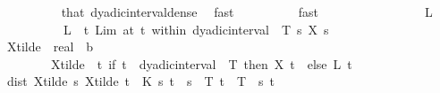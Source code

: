 \begin{isabellebody}
\ \ \ \ \ \ \ \ \isamarkupfalse%
\ that\ dyadic{\isacharunderscore}{\kern0pt}interval{\isacharunderscore}{\kern0pt}dense\ \isamarkupfalse%
\ fast\isanewline
\ \ \ \ \ \ \ \ \isamarkupfalse%
\ fast\isanewline
\ \ \ \ \ \ \ \ \isamarkupfalse%
\isanewline
\ \ \ \ \ \ \isamarkupfalse%
\ L\ \isanewline
\ \ \ \ \ \ \ \ \ \ {\isachardoublequoteopen}L\ {\isasymequiv}\ {\isacharparenleft}{\kern0pt}{\isasymlambda}t{\isachardot}{\kern0pt}\ {\isacharparenleft}{\kern0pt}Lim\ {\isacharparenleft}{\kern0pt}at\ t\ within\ dyadic{\isacharunderscore}{\kern0pt}interval\ {}\ T{\isacharparenright}{\kern0pt}\ {\isacharparenleft}{\kern0pt}{\isasymlambda}s{\isachardot}{\kern0pt}\ X\ s\ {\isasymomega}{\isacharparenright}{\kern0pt}{\isacharparenright}{\kern0pt}{\isacharparenright}{\kern0pt}{\isachardoublequoteclose}\isanewline
\ \ \ \ \ \ \isamarkupfalse%
\ X{\isacharunderscore}{\kern0pt}tilde\ {\isacharcolon}{\kern0pt}{\isacharcolon}{\kern0pt}\ {\isachardoublequoteopen}real\ {\isasymRightarrow}\ {\isacharprime}{\kern0pt}b{\isachardoublequoteclose}\ \isanewline
\ \ \ \ \ \ \ \ {\isachardoublequoteopen}X{\isacharunderscore}{\kern0pt}tilde\ {\isasymequiv}\ {\isasymlambda}t{\isachardot}{\kern0pt}\ if\ t\ {\isasymin}\ dyadic{\isacharunderscore}{\kern0pt}interval\ {}\ T\ then\ X\ t\ {\isasymomega}\ else\ L\ t{\isachardoublequoteclose}\isanewline
\ \ \ \ \ \ \isamarkupfalse%
\ \isamarkupfalse%
\ {\isachardoublequoteopen}dist\ {\isacharparenleft}{\kern0pt}X{\isacharunderscore}{\kern0pt}tilde\ s{\isacharparenright}{\kern0pt}\ {\isacharparenleft}{\kern0pt}X{\isacharunderscore}{\kern0pt}tilde\ t{\isacharparenright}{\kern0pt}\ {\isasymle}\ {\isacharquery}{\kern0pt}K\ s\ t{\isachardoublequoteclose}\ \ {\isachardoublequoteopen}s\ {\isasymin}\ {\isacharbraceleft}{\kern0pt}{}{\isachardot}{\kern0pt}{\isachardot}{\kern0pt}T{\isacharbraceright}{\kern0pt}{\isachardoublequoteclose}\ {\isachardoublequoteopen}t\ {\isasymin}\ {\isacharbraceleft}{\kern0pt}{}{\isachardot}{\kern0pt}{\isachardot}{\kern0pt}T{\isacharbraceright}{\kern0pt}{\isachardoublequoteclose}\ \ s\ t\isanewline
\ \ \ \ \ \ \ \ \isamarkupfalse%
%
\begin{isamarkuptext}%

\end{isamarkuptext}
\end{isabellebody}

